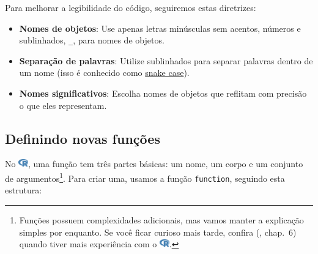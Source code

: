 \documentclass[
  letterpaper,
]{book}
\theoremstyle{definition}
\theoremstyle{plain}
\theoremstyle{remark}
\begin{document}
\begin{tcolorbox}[enhanced jigsaw, colback=white, bottomrule=.15mm, colframe=quarto-callout-important-color-frame, rightrule=.15mm, opacityback=0, toptitle=1mm, arc=.35mm, toprule=.15mm, bottomtitle=1mm, titlerule=0mm, opacitybacktitle=0.6, leftrule=.75mm, colbacktitle=quarto-callout-important-color!10!white, coltitle=black, title=\textcolor{quarto-callout-important-color}{\faExclamation}\hspace{0.5em}{Importante}, breakable, left=2mm]

Para melhorar a legibilidade do código, seguiremos estas diretrizes:

\begin{itemize}
\item
  \textbf{Nomes de objetos}: Use apenas letras minúsculas sem acentos,
  números e sublinhados, \texttt{\_}, para nomes de objetos.
\item
  \textbf{Separação de palavras}: Utilize sublinhados para separar
  palavras dentro de um nome (isso é conhecido como
  \href{https://en.wikipedia.org/wiki/Snake_case}{snake case}).
\item
  \textbf{Nomes significativos}: Escolha nomes de objetos que reflitam
  com precisão o que eles representam.
\end{itemize}

\end{tcolorbox}

\subsection{Definindo novas
funções}\label{definindo-novas-funuxe7uxf5es}

No
\includegraphics[width=1.13em,height=1em]{getting_started_with_r_files/figure-pdf/fa-icon-9b00320707d42527dde67262afb33ded.pdf},
uma função tem três partes básicas: um nome, um corpo e um conjunto de
argumentos\footnote{Funções possuem complexidades adicionais, mas vamos
  manter a explicação simples por enquanto. Se você ficar curioso mais
  tarde, confira (,
  chap.~6) quando tiver mais experiência com o
  \includegraphics[width=1.13em,height=1em]{getting_started_with_r_files/figure-pdf/fa-icon-9b00320707d42527dde67262afb33ded.pdf}.}.
Para criar uma, usamos a função \texttt{function}, seguindo esta
estrutura:
\end{document}
